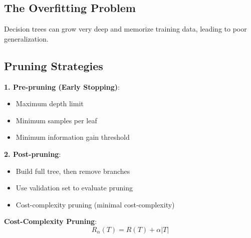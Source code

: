 \documentclass{article}
\begin{document}
\subsection{The Overfitting Problem}

Decision trees can grow very deep and memorize training data, leading to poor generalization.

\begin{center}
\end{center}

\subsection{Pruning Strategies}

\textbf{1. Pre-pruning (Early Stopping)}:
\begin{itemize}
    \item Maximum depth limit
    \item Minimum samples per leaf
    \item Minimum information gain threshold
\end{itemize}

\textbf{2. Post-pruning}:
\begin{itemize}
    \item Build full tree, then remove branches
    \item Use validation set to evaluate pruning
    \item Cost-complexity pruning (minimal cost-complexity)
\end{itemize}

\textbf{Cost-Complexity Pruning}:
$$R_\alpha(T) = R(T) + \alpha |T|$$
\end{document}
